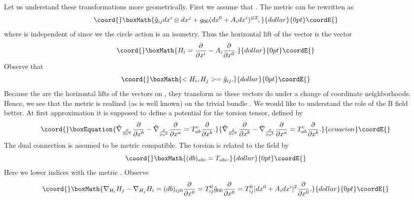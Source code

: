 \documentclass[a4paper,11pt]{amsart}
\begin{document}
Let us understand these transformations more geometrically. First we assume
 that \coordHE{}. The metric \coordHE{} can be rewritten as
$$\coord{}\boxMath{\hat g_{ij}dx^i\otimes dx^j + g_{00}(dx^0 + A_idx^i)^{\otimes 2},}{dollar}{0pt}\coordE{}$$
where \coordHE{} is independent of \coordHE{} since we the circle action
is an isometry.
Thus the horizontal lift of the vector \coordHE{} is the 
vector 
$$\coord{}\boxMath{H_i = \frac{\partial}{\partial x^i} - A_i\frac{\partial}{\partial x^0}.}{dollar}{0pt}\coordE{}$$
Observe that 
$$\coord{}\boxMath{<H_i,H_j> = \hat g_{ij}.}{dollar}{0pt}\coordE{}$$
Because the \coordHE{} are the horizontal lifts of the vectors 
\coordHE{} on \coordHE{}, they transform as these vectors do 
under a change of coordinate neighborhoods. Hence, we see that the metric 
\coordHE{} is realized (as is well known) on the trivial bundle 
\coordHE{}.  
We would like to understand the role of the B field better. At first
approximation it is supposed to define a potential for the torsion tensor, 
\coordHE{} defined by 
\begin{equation}\coord{}\boxEquation{\label{tors}
\hat\nabla_{\frac{\partial}{\partial x^a}} \frac{\partial}{\partial x^b}
 - \hat\nabla_{\frac{\partial}{\partial x^b}} \frac{\partial}{\partial x^a} = 
 T_{ab}^c \frac{\partial}{\partial x^b}.
 }{\hat\nabla_{\frac{\partial}{\partial x^a}} \frac{\partial}{\partial x^b}
 - \hat\nabla_{\frac{\partial}{\partial x^b}} \frac{\partial}{\partial x^a} = 
 T_{ab}^c \frac{\partial}{\partial x^b}.
 }{ecuacion}\coordE{}\end{equation}
 The \coordHE{} dual connection \myHighlight{$\hat\nabla$}\coordHE{} is assumed to be metric compatible. The torsion is
 related to the \coordHE{} field by 
 $$\coord{}\boxMath{(db)_{abc} = T_{abc}.}{dollar}{0pt}\coordE{}$$
 Here we lower indices with the metric \coordHE{}.
Observe 
$$\coord{}\boxMath{\nabla_{H_i}H_j - \nabla_{H_j}H_i
 = (db)_{ij0}\frac{\partial}{\partial x^0}
  = T_{ij}^0\hat g_{00}\frac{\partial}{\partial x^0} =
  T_{ij}^0|dx^0+A_idx^i|^2\frac{\partial}{\partial x^0}.}{dollar}{0pt}\coordE{}$$
  
\end{document}
